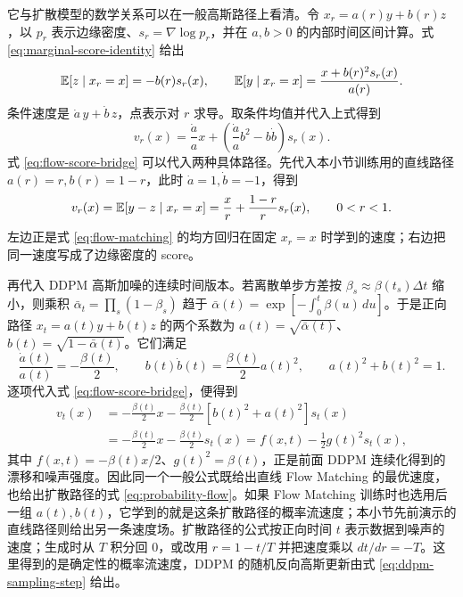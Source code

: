 它与扩散模型的数学关系可以在一般高斯路径上看清。令 \(x_r=a(r)y+b(r)z\)，以 \(p_r\) 表示边缘密度、\(s_r=\nabla\log p_r\)，并在 \(a,b>0\) 的内部时间区间计算。式 \eqref{eq:marginal-score-identity} 给出
\begin{equation}
 \mathbb{E}[z\mid x_r=x]=-b(r)s_r(x),\qquad
 \mathbb{E}[y\mid x_r=x]=\frac{x+b(r)^2s_r(x)}{a(r)}.
\end{equation}
条件速度是 \(\dot a\,y+\dot b\,z\)，点表示对 \(r\) 求导。取条件均值并代入上式得到
\begin{equation}
 v_r(x)=\frac{\dot a}{a}x+
 \left(\frac{\dot a}{a}b^2-b\dot b\right)s_r(x).
 \label{eq:flow-score-bridge}
\end{equation}
式 \eqref{eq:flow-score-bridge} 可以代入两种具体路径。先代入本小节训练用的直线路径 \(a(r)=r,b(r)=1-r\)，此时 \(\dot a=1,\dot b=-1\)，得到
\begin{equation}
 v_r(x)=\mathbb{E}[y-z\mid x_r=x]
 =\frac{x}{r}+\frac{1-r}{r}s_r(x),\qquad 0<r<1.
 \label{eq:straight-flow-score}
\end{equation}
左边正是式 \eqref{eq:flow-matching} 的均方回归在固定 \(x_r=x\) 时学到的速度；右边把同一速度写成了边缘密度的 score。

再代入 DDPM 高斯加噪的连续时间版本。若离散单步方差按 \(\beta_s\approx\beta(t_s)\Delta t\) 缩小，则乘积 \(\bar\alpha_t=\prod_s(1-\beta_s)\) 趋于 \(\bar\alpha(t)=\exp[-\int_0^t\beta(u)\,du]\)。于是正向路径 \(x_t=a(t)y+b(t)z\) 的两个系数为 \(a(t)=\sqrt{\bar\alpha(t)}\)、\(b(t)=\sqrt{1-\bar\alpha(t)}\)。它们满足
\begin{equation}
 \frac{\dot a(t)}{a(t)}=-\frac{\beta(t)}2,\qquad
 b(t)\dot b(t)=\frac{\beta(t)}2a(t)^2,\qquad a(t)^2+b(t)^2=1.
 \label{eq:vp-path-derivatives}
\end{equation}
逐项代入式 \eqref{eq:flow-score-bridge}，便得到
\begin{equation}
\begin{aligned}
 v_t(x)
 &=-\frac{\beta(t)}2x-\frac{\beta(t)}2[b(t)^2+a(t)^2]s_t(x)\\
 &=-\frac{\beta(t)}2x-\frac{\beta(t)}2s_t(x)
 =f(x,t)-\frac12g(t)^2s_t(x),
\end{aligned}
 \label{eq:vp-flow-from-bridge}
\end{equation}
其中 \(f(x,t)=-\beta(t)x/2\)、\(g(t)^2=\beta(t)\)，正是前面 DDPM 连续化得到的漂移和噪声强度。因此同一个一般公式既给出直线 Flow Matching 的最优速度，也给出扩散路径的式 \eqref{eq:probability-flow}。如果 Flow Matching 训练时也选用后一组 \(a(t),b(t)\)，它学到的就是这条扩散路径的概率流速度；本小节先前演示的直线路径则给出另一条速度场。扩散路径的公式按正向时间 \(t\) 表示数据到噪声的速度；生成时从 \(T\) 积分回 0，或改用 \(r=1-t/T\) 并把速度乘以 \(dt/dr=-T\)。这里得到的是确定性的概率流速度，DDPM 的随机反向高斯更新由式 \eqref{eq:ddpm-sampling-step} 给出。

